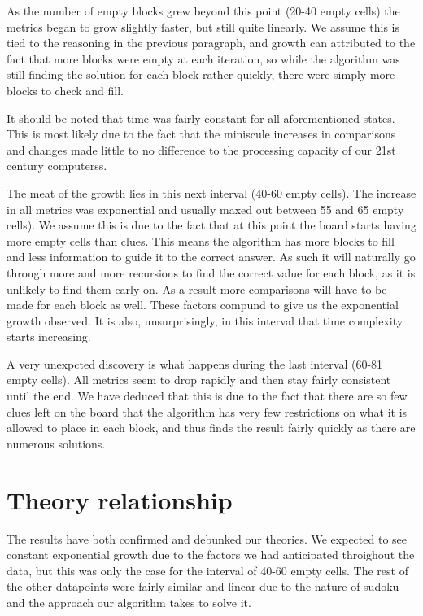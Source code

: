 \documentclass{article}
\begin{document}
    As the number of empty blocks grew beyond this point (20-40  empty cells) the metrics began to grow slightly faster, but still quite linearly. We assume this is tied to the reasoning in the previous paragraph, and growth can attributed to the fact that more blocks were empty at each iteration, so while the algorithm was still finding the solution for each block rather quickly, there were simply more blocks to check and fill.


    It should be noted that time was fairly constant for all aforementioned states. This is most likely due to the fact that the miniscule increases in comparisons and changes made little to no difference to the processing capacity of our 21st century computerss.


    The meat of the growth lies in this next interval (40-60 empty cells). The increase in all metrics was exponential and usually maxed out between 55 and 65 empty cells). We assume this is due to the fact that at this point the board starts having more empty cells than clues. This means the algorithm has more blocks to fill and less information to guide it to the correct answer. As such it will naturally go through more and more recursions to find the correct value for each block, as it is unlikely to find them early on. As a result more comparisons will have to be made for each block as well. These factors compund to give us the exponential growth observed. It is also, unsurprisingly, in this interval that time complexity starts increasing.


    A very unexpcted discovery is what happens during the last interval (60-81 empty cells). All metrics seem to drop rapidly and then stay fairly consistent until the end. We have deduced that this is due to the fact that there are so few clues left on the board that the algorithm has very few restrictions on what it is allowed to place in each block, and thus finds the result fairly quickly as there are numerous solutions.

    \pagebreak 
    \section{Theory relationship}
    The results have both confirmed and debunked our theories. We expected to see constant exponential growth due to the factors we had anticipated throighout the data, but this was only the case for the interval of 40-60 empty cells. The rest of the other datapoints were fairly similar and linear due to the nature of sudoku and the approach our algorithm takes to solve it.
\end{document}
